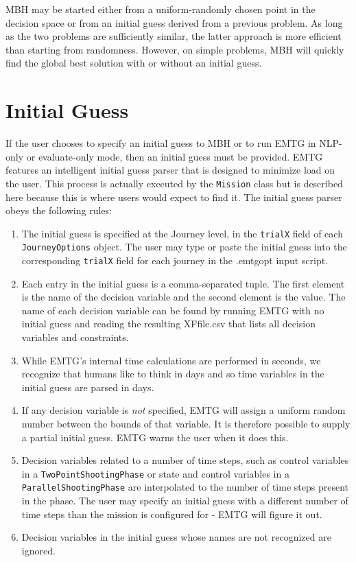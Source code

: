 \ac{MBH} may be started either from a uniform-randomly chosen point in the decision space or from an initial guess derived from a previous problem. As long as the two problems are sufficiently similar, the latter approach is more efficient than starting from randomness. However, on simple problems, \ac{MBH} will quickly find the global best solution with or without an initial guess.

\section{Initial Guess}
\label{sec:initial_guess}

If the user chooses to specify an initial guess to \ac{MBH} or to run \ac{EMTG} in \ac{NLP}-only or evaluate-only mode, then an initial guess must be provided. \ac{EMTG} features an intelligent initial guess parser that is designed to minimize load on the user. This process is actually executed by the \texttt{Mission} class but is described here because this is where users would expect to find it. The initial guess parser obeys the following rules:

\begin{enumerate}
	\item The initial guess is specified at the Journey level, in the \texttt{trialX} field of each \texttt{JourneyOptions} object. The user may type or paste the initial guess into the corresponding \texttt{trialX} field for each journey in the .emtgopt input script.
	\item Each entry in the initial guess is a comma-separated tuple. The first element is the name of the decision variable and the second element is the value. The name of each decision variable can be found by running \ac{EMTG} with no initial guess and reading the resulting XFfile.csv that lists all decision variables and constraints.
	\item While \ac{EMTG}'s internal time calculations are performed in seconds, we recognize that humans like to think in days and so time variables in the initial guess are parsed in days.
	\item If any decision variable is \textit{not} specified, \ac{EMTG} will assign a uniform random number between the bounds of that variable. It is therefore possible to supply a partial initial guess. \ac{EMTG} warns the user when it does this.
	\item Decision variables related to a number of time steps, such as control variables in a \texttt{TwoPointShootingPhase} or state and control variables in a \texttt{ParallelShootingPhase} are interpolated to the number of time steps present in the phase. The user may specify an initial guess with a different number of time steps than the mission is configured for - \ac{EMTG} will figure it out.
	\item Decision variables in the initial guess whose names are not recognized are ignored.
\end{enumerate}